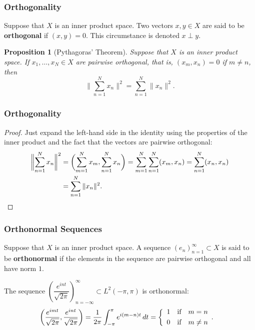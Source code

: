 \documentclass[handout]{beamer}
\newtheorem{proposition}{Proposition}
\theoremstyle{remark}
\begin{document}
\begin{frame}\frametitle{Orthogonality}

\begin{definition}
Suppose that $X$ is an inner product space. Two vectors $x,y\in X$ are said to be {\bf orthogonal}
if $(x,y)=0$. This circumstance is denoted $x\perp y$.
\end{definition}

\begin{proposition}[Pythagoras' Theorem]
Suppose that $X$ is an inner product space. If $x_1,\ldots,x_N\in X$ are pairwise orthogonal, that is,
$(x_m,x_n)=0$ if $m\neq n$, then
$$\biggl\|\sum^N_{n=1}x_n\biggr\|^2=\sum^N_{n=1}\|x_n\|^2.$$
\end{proposition}

\end{frame}

\begin{frame}\frametitle{Orthogonality}

\begin{proof}
Just expand the left-hand side in the identity using the properties of the inner product
and the fact that the vectors are pairwise orthogonal:
\begin{align*}
\biggl\|\sum\limits^N_{n=1}x_n\biggr\|^2
&=\biggl(\sum\limits^N_{m=1}x_m,\sum\limits^N_{n=1}x_n\biggr)
=\sum\limits^N_{m=1}\sum\limits^N_{n=1}(x_m,x_n)=\sum\limits^N_{n=1}(x_n,x_n)\\
&=\sum\limits^N_{n=1}\|x_n\|^2.\qedhere
\end{align*}
\end{proof}

\end{frame}

\begin{frame}\frametitle{Orthonormal Sequences}

\begin{definition}\label{H1def4.5}
Suppose that $X$ is an inner product space. A sequence $(e_n)^\infty_{n=1}\subset X$ is said
to be {\bf orthonormal} if the elements in the sequence are pairwise orthogonal and all have norm $1$.
\end{definition}

\begin{example}
The sequence $\left(\dfrac{e^{int}}{\sqrt{2\pi}}\right)^\infty_{n=-\infty}\subset L^2(-\pi,\pi)$ is orthonormal:
\begin{align*}
\left(\frac{e^{imt}}{\sqrt{2\pi}},\frac{e^{int}}{\sqrt{2\pi}}\right)&=\frac{1}{2\pi}\int^\pi_{-\pi}e^{i(m-n)t}\,dt
=\biggl\{\begin{array}{lcl}
1&\mbox{if}&m=n\smallskip\\
0&\mbox{if}&m\neq n
\end{array}\biggr..
\end{align*}
\end{example}

\end{frame}
\end{document}
